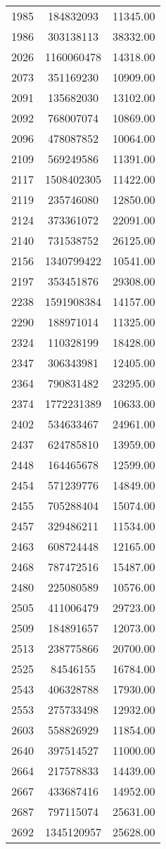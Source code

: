 \begin{centering}
\begin{supertabular}{|c|c|c|}
  1985 & 184832093 & 11345.00 \\ 
  1986 & 303138113 & 38332.00 \\ 
  2026 & 1160060478 & 14318.00 \\ 
  2073 & 351169230 & 10909.00 \\ 
  2091 & 135682030 & 13102.00 \\ 
  2092 & 768007074 & 10869.00 \\ 
  2096 & 478087852 & 10064.00 \\ 
  2109 & 569249586 & 11391.00 \\ 
  2117 & 1508402305 & 11422.00 \\ 
  2119 & 235746080 & 12850.00 \\ 
  2124 & 373361072 & 22091.00 \\ 
  2140 & 731538752 & 26125.00 \\ 
  2156 & 1340799422 & 10541.00 \\ 
  2197 & 353451876 & 29308.00 \\ 
  2238 & 1591908384 & 14157.00 \\ 
  2290 & 188971014 & 11325.00 \\ 
  2324 & 110328199 & 18428.00 \\ 
  2347 & 306343981 & 12405.00 \\ 
  2364 & 790831482 & 23295.00 \\ 
  2374 & 1772231389 & 10633.00 \\ 
  2402 & 534633467 & 24961.00 \\ 
  2437 & 624785810 & 13959.00 \\ 
  2448 & 164465678 & 12599.00 \\ 
  2454 & 571239776 & 14849.00 \\ 
  2455 & 705288404 & 15074.00 \\ 
  2457 & 329486211 & 11534.00 \\ 
  2463 & 608724448 & 12165.00 \\ 
  2468 & 787472516 & 15487.00 \\ 
  2480 & 225080589 & 10576.00 \\ 
  2505 & 411006479 & 29723.00 \\ 
  2509 & 184891657 & 12073.00 \\ 
  2513 & 238775866 & 20700.00 \\ 
  2525 & 84546155 & 16784.00 \\ 
  2543 & 406328788 & 17930.00 \\ 
  2553 & 275733498 & 12932.00 \\ 
  2603 & 558826929 & 11854.00 \\ 
  2640 & 397514527 & 11000.00 \\ 
  2664 & 217578833 & 14439.00 \\ 
  2667 & 433687416 & 14952.00 \\ 
  2687 & 797115074 & 25631.00 \\ 
  2692 & 1345120957 & 25628.00 \\ 
\end{supertabular}
\end{centering}
\onecolumn
